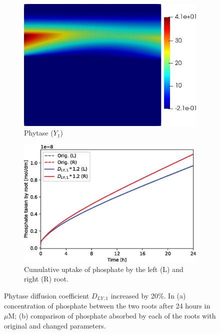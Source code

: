 \documentclass[11pt]{article}
\numberwithin{equation}{section}
\begin{document}
\begin{figure}[!htb]
\centering
\begin{subfigure}[t]{0.35\textwidth}
    \includegraphics[width=\textwidth]{Figures/Y1_DY1up20.png}
    \caption{Phytase ($Y_1$)}
    \label{fig:numexp_DLY1up1}
\end{subfigure}
\qquad
\begin{subfigure}[t]{0.4\textwidth}
    \includegraphics[width=\textwidth]{Figures/DY1up20.eps}
    \caption{Cumulative uptake of phosphate by the left (L) and right (R) root.}
    \label{fig:numexp_DLY1up2}
\end{subfigure}

\caption{Phytase diffusion coefficient $D_{LY,1}$ increased by 20\%. In (a) concentration of phosphate between the two roots after 24 hours in $\mu$M; (b) comparison of phosphate absorbed by each of the roots with original and changed parameters.}
\label{fig:numexp_DLY1up}
\end{figure}
\end{document}
